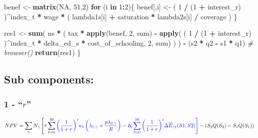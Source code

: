 \documentclass[]{article}
\newenvironment{Shaded}{\begin{snugshade}}{\end{snugshade}}
\newcommand{\CommentTok}[1]{\textcolor[rgb]{0.56,0.35,0.01}{\textit{#1}}}
\newcommand{\ControlFlowTok}[1]{\textcolor[rgb]{0.13,0.29,0.53}{\textbf{#1}}}
\newcommand{\DecValTok}[1]{\textcolor[rgb]{0.00,0.00,0.81}{#1}}
\newcommand{\KeywordTok}[1]{\textcolor[rgb]{0.13,0.29,0.53}{\textbf{#1}}}
\newcommand{\NormalTok}[1]{#1}
\newcommand{\OperatorTok}[1]{\textcolor[rgb]{0.81,0.36,0.00}{\textbf{#1}}}
\newcommand{\OtherTok}[1]{\textcolor[rgb]{0.56,0.35,0.01}{#1}}
\newcommand{\StringTok}[1]{\textcolor[rgb]{0.31,0.60,0.02}{#1}}
\begin{document}
\begin{Shaded}
\begin{Highlighting}[]
\NormalTok{  benef <-}\StringTok{ }\KeywordTok{matrix}\NormalTok{(}\OtherTok{NA}\NormalTok{, }\DecValTok{51}\NormalTok{,}\DecValTok{2}\NormalTok{)}
  \ControlFlowTok{for}\NormalTok{ (i }\ControlFlowTok{in} \DecValTok{1}\OperatorTok{:}\DecValTok{2}\NormalTok{)\{}
\NormalTok{  benef[,i] <-}\StringTok{ }\NormalTok{( }\DecValTok{1} \OperatorTok{/}\StringTok{ }\NormalTok{(}\DecValTok{1} \OperatorTok{+}\StringTok{ }\NormalTok{interest_r) )}\OperatorTok{^}\NormalTok{index_t }\OperatorTok{*}\StringTok{ }\NormalTok{wage }\OperatorTok{*}\StringTok{ }
\StringTok{                     }\NormalTok{( lambda1s[i] }\OperatorTok{+}\StringTok{ }\NormalTok{saturation }\OperatorTok{*}\StringTok{ }\NormalTok{lambda2s[i] }\OperatorTok{/}\StringTok{ }\NormalTok{coverage ) }
\NormalTok{  \}}
  
\NormalTok{  res1 <-}\StringTok{ }\KeywordTok{sum}\NormalTok{( ns }\OperatorTok{*}\StringTok{ }\NormalTok{( tax }\OperatorTok{*}\StringTok{ }\KeywordTok{apply}\NormalTok{(benef, }\DecValTok{2}\NormalTok{, sum) }\OperatorTok{-}\StringTok{ }
\StringTok{            }\KeywordTok{apply}\NormalTok{( ( }\DecValTok{1} \OperatorTok{/}\StringTok{ }\NormalTok{(}\DecValTok{1} \OperatorTok{+}\StringTok{ }\NormalTok{interest_r) )}\OperatorTok{^}\NormalTok{index_t }\OperatorTok{*}\StringTok{ }
\StringTok{                     }\NormalTok{delta_ed_s }\OperatorTok{*}\StringTok{ }\NormalTok{cost_of_schooling, }\DecValTok{2}\NormalTok{, sum) )}
\NormalTok{          ) }\OperatorTok{-}\StringTok{ }\NormalTok{(s2 }\OperatorTok{*}\StringTok{ }\NormalTok{q2  }\OperatorTok{-}\StringTok{ }\NormalTok{s1 }\OperatorTok{*}\StringTok{ }\NormalTok{q1) }
\CommentTok{#  browser()}
  \KeywordTok{return}\NormalTok{(res1)  }
\NormalTok{\}}
\end{Highlighting}
\end{Shaded}

\hypertarget{sub-components}{%
\subsection{Sub components:}\label{sub-components}}

\hypertarget{r}{%
\subsubsection{\texorpdfstring{1 - ``\(r\)''}{1 - ``r''}}\label{r}}

\begin{equation}
NPV =  \sum_{\gamma} N_{\gamma} \left[ 
\tau \sum_{t=0}^{50} \color{blue}{\left(  \frac{1}{1 + r}\right)}^{t} w_{t} 
\left( \lambda_{1, \gamma} + \frac{p \lambda_{2, \gamma}}{R} \right) - 
K \sum_{t=0}^{50} \color{blue}{\left( \frac{1}{1 + r}\right)}^{t} \Delta \overline{E}_{\gamma t}(S1,S2)
\right] - \left( S_{2}Q(S_{2}) - S_{1}Q(S_{1}) \right)
\end{equation}
\end{document}
